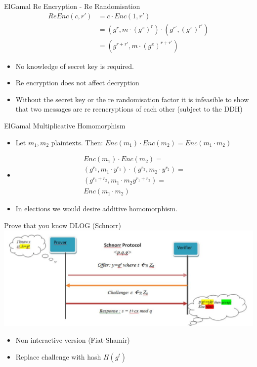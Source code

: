 \documentclass{beamer}
\begin{document}
\begin{frame}{ElGamal Re Encryption - Re Randomisation \cite{AdidaGoogle}}
\begin{align*}
 ReEnc(c,r') & = c \cdot Enc(1,r') \\
	 & = (g^r, m \cdot (g^x)^{r}) \cdot (g^{r'}, (g^x)^{r'}) \\
	 & = (g^{r+r'},m \cdot (g^x)^{r+r'}) 
\end{align*}
\begin{itemize}
\item No knowledge of secret key is required.
\item Re encryption does not affect decryption
\item Without the secret key or the re randomisation factor it is infeasible to show that two messages are re reencryptions of each other (subject to the DDH)
\end{itemize}
\end{frame}

\begin{frame}{ElGamal Multiplicative Homomorphism}
\begin{itemize}
\item Let $m_1, m_2$ plaintexts. Then:
$Enc(m_1) \cdot Enc(m_2) = Enc(m_1 \cdot m_2)$
\item 
\begin{align*}
 Enc(m_1) \cdot Enc(m_2) = \\
 ( g^{r_1},m_1 \cdot y^{r_1} ) \cdot ( g^{r_2},m_2 \cdot y^{r_2} ) = \\
 ( g^{r_1+r_2},m_1 \cdot m_2 y^{r_1+r_2} ) = \\
 Enc(m_1 \cdot m_2)
\end{align*}
\item In elections we would desire additive homomorphism.
\end{itemize}
\end{frame}

\begin{frame}{Prove that you know DLOG (Schnorr)}
\includegraphics[scale=0.4]{schnorr.jpg}
\begin{itemize}
\item Non interactive version (Fiat-Shamir)
\item Replace challenge with hash $ H(g^t) $ 
\end{itemize}
\end{frame} 
\end{document}
